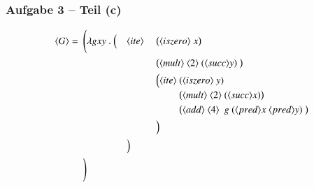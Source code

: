 \documentclass[aspectratio=1610,onlymath, ngerman]{beamer}
\newcommand{\num}[1]{\ensuremath{\langle #1 \rangle}}
\begin{document}
	\begin{frame} \frametitle{Aufgabe 3 -- Teil (c)}
	\small
		\begin{alignat*}{3}
			\num{G} = \enskip & \Biggl( \lambda g xy \ . \ \Bigl( &&\num{ite} \ && \bigl( \num{iszero} \ x \bigr) \\
			&&&&& \bigl( \num{mult} \ \num{2} \ (\num{succ} y) \ \bigr) \\
			&&&&& \Bigl( 
			\begin{alignedat}[t]{1}
				\num{ite} \ &(\num{iszero} \ y) \\
				& \bigl( \num{mult} \ \num{2} \ (\num{succ} x) \bigr) \\
				& \bigl( \num{add} \ \num{4} \enskip g \ (\num{pred} x \ \num{pred} y)  \ \bigr) \\				
			\end{alignedat} \\
			&&&&& \Bigr) \\
			&&& \Bigr) \\
			& \Biggr)
		\end{alignat*}
	\end{frame}
\end{document}

